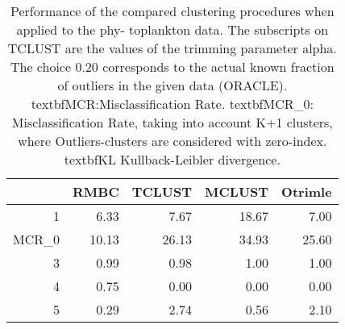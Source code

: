 \begin{table}[ht]
\centering
\begin{tabular}{rrrrr}
  \hline
 & RMBC & TCLUST & MCLUST & Otrimle \\ 
  \hline
1 & 6.33 & 7.67 & 18.67 & 7.00 \\ 
  MCR\_0 & 10.13 & 26.13 & 34.93 & 25.60 \\ 
  3 & 0.99 & 0.98 & 1.00 & 1.00 \\ 
  4 & 0.75 & 0.00 & 0.00 & 0.00 \\ 
  5 & 0.29 & 2.74 & 0.56 & 2.10 \\ 
   \hline
\end{tabular}
\caption{Performance of the compared clustering procedures when applied to the phy-
toplankton data. The subscripts on TCLUST are the values of the trimming parameter alpha. The choice 0.20 corresponds to the actual known fraction of outliers in the given data
(ORACLE). textbf{MCR}:Misclassification Rate. textbf{MCR_0}: Misclassification Rate, 
taking into account K+1 clusters, where Outliers-clusters 
are considered with zero-index.  textbf{KL} Kullback-Leibler divergence.} 
\end{table}
